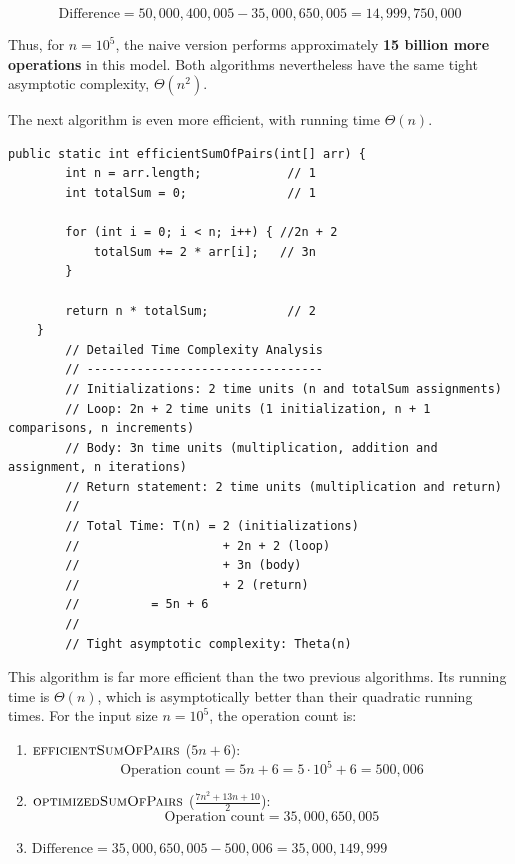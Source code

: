 \[
\text{Difference} = 50,000,400,005-35,000,650,005=14,999,750,000
\]

Thus, for \(n=10^5\), the naive version performs approximately \textbf{15 billion more operations} in this model. Both algorithms nevertheless have the same tight asymptotic complexity, $\Theta(n^2)$.

The next algorithm is even more efficient, with running time $\Theta(n)$.
\begin{lstlisting}[style = javaStyle, caption={Efficient Sum of Pairs with Analysis}, label={lst:java_efficient_sum_pairs_analysis}]
    public static int efficientSumOfPairs(int[] arr) {
        int n = arr.length;            // 1
        int totalSum = 0;              // 1
    
        for (int i = 0; i < n; i++) { //2n + 2
            totalSum += 2 * arr[i];   // 3n
        }
    
        return n * totalSum;           // 2
    }
        // Detailed Time Complexity Analysis
        // ---------------------------------
        // Initializations: 2 time units (n and totalSum assignments)
        // Loop: 2n + 2 time units (1 initialization, n + 1 comparisons, n increments)
        // Body: 3n time units (multiplication, addition and assignment, n iterations)
        // Return statement: 2 time units (multiplication and return)
        //
        // Total Time: T(n) = 2 (initializations)
        //                    + 2n + 2 (loop)
        //                    + 3n (body)
        //                    + 2 (return)
        //          = 5n + 6
        //
        // Tight asymptotic complexity: Theta(n)
\end{lstlisting}    

This algorithm is far more efficient than the two previous algorithms. Its running time is $\Theta(n)$, which is asymptotically better than their quadratic running times. For the input size \(n = 10^5\), the operation count is:

\begin{enumerate}
    \item $\proc{efficientSumOfPairs}$ (\(5n+6\)):
    \[
    \text{Operation count} = 5n+6 = 5\cdot 10^5+6 = 500,006
    \]
    \item $\proc{optimizedSumOfPairs}$ (\(\tfrac{7n^2+13n+10}{2}\)):
    \[
    \text{Operation count} = 35,000,650,005
    \]
    \item $\text{Difference} = 35,000,650,005-500,006=35,000,149,999$
\end{enumerate}

